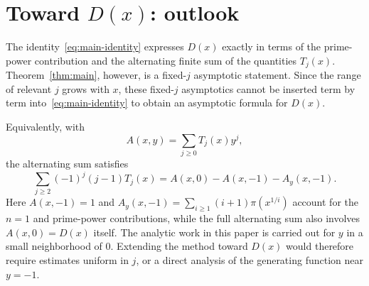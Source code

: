 \section{Toward \texorpdfstring{$D(x)$}{D(x)}: outlook}\label{sec:outlook}
The identity~\eqref{eq:main-identity} expresses $D(x)$ exactly in
terms of the prime-power contribution and the alternating finite sum
of the quantities $T_j(x)$. Theorem~\ref{thm:main}, however, is a
fixed-$j$ asymptotic statement. Since the range of relevant $j$ grows
with $x$, these fixed-$j$ asymptotics cannot be inserted term by term
into~\eqref{eq:main-identity} to obtain an asymptotic formula for
$D(x)$.

Equivalently, with
\[
A(x,y)=\sum_{j\geq0}T_j(x)y^j,
\]
the alternating sum satisfies
\[
    \sum_{j\geq2}(-1)^j(j-1)T_j(x)
    = A(x,0)-A(x,-1)-A_y(x,-1).
\]
Here $A(x,-1)=1$ and $A_y(x,-1)=\sum_{i\geq1}(i+1)\pi(x^{1/i})$
account for the $n=1$ and prime-power contributions, while the full
alternating sum also involves $A(x,0)=D(x)$ itself. The analytic
work in this paper is carried out for $y$ in a small neighborhood of
$0$. Extending the method toward $D(x)$ would therefore require
estimates uniform in $j$, or a direct analysis of the generating
function near $y=-1$.


